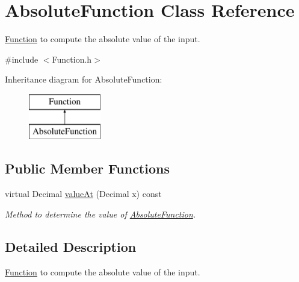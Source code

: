 \hypertarget{class_absolute_function}{\section{Absolute\+Function Class Reference}
\label{class_absolute_function}
}


\hyperlink{class_function}{Function} to compute the absolute value of the input.  




{\ttfamily \#include $<$Function.\+h$>$}

Inheritance diagram for Absolute\+Function\+:\begin{figure}[H]
\begin{center}
\leavevmode
\includegraphics[height=2.000000cm]{class_absolute_function}
\end{center}
\end{figure}
\subsection*{Public Member Functions}
\begin{DoxyCompactItemize}
\item 
virtual Decimal \hyperlink{class_absolute_function_a10fbd656965076a13b6a58ba908b242f}{value\+At} (Decimal x) const 
\begin{DoxyCompactList}\small\item\em Method to determine the value of \hyperlink{class_absolute_function}{Absolute\+Function}. \end{DoxyCompactList}\end{DoxyCompactItemize}


\subsection{Detailed Description}
\hyperlink{class_function}{Function} to compute the absolute value of the input. 

